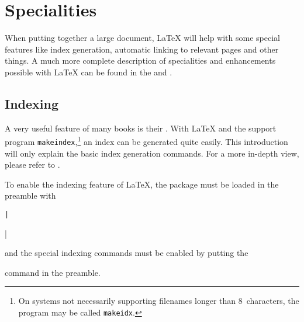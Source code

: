 %
%
%
%


\chapter{Specialities}\label{specialities}
\begin{intro}
  When putting together a large document, \LaTeX{} will help with some special
  features like index generation, automatic linking to relevant pages and other
  things. A much more complete description of specialities and enhancements
  possible with \LaTeX{} can be found in the {\normalfont\manual{}} and
    {\normalfont\companion}.
\end{intro}

\section{Indexing}\label{sec:indexing}
A very useful feature of many books is their . With \LaTeX{}
and the support program \texttt{makeindex},\footnote{On systems not
  necessarily supporting
  filenames longer than 8~characters, the program may be called
  \texttt{makeidx}.} an index can be generated quite easily.  This
introduction will only explain the basic index generation commands.
For a more in-depth view, please refer to \companion.

To enable the indexing feature of \LaTeX{}, the  package
must be loaded in the preamble with
\begin{lscommand}
  \texttt|\usepackage{makeidx}|
\end{lscommand}
\noindent and the special indexing commands must be enabled by putting
the
\begin{lscommand}
\end{lscommand}
\noindent command in the preamble.

